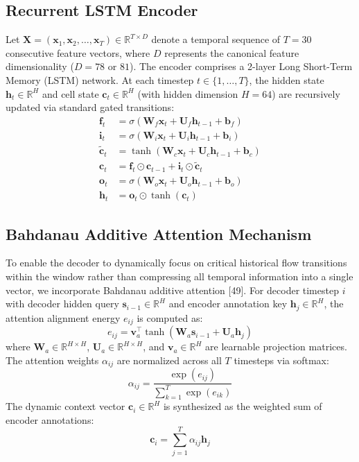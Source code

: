 \documentclass[twocolumn]{article}
\begin{document}
\subsection{Recurrent LSTM Encoder}
Let $\mathbf{X} = (\mathbf{x}_1, \mathbf{x}_2, \dots, \mathbf{x}_T) \in \mathbb{R}^{T \times D}$ denote a temporal sequence of $T=30$ consecutive feature vectors, where $D$ represents the canonical feature dimensionality ($D=78$ or $81$). The encoder comprises a 2-layer Long Short-Term Memory (LSTM) network. At each timestep $t \in \{1, \dots, T\}$, the hidden state $\mathbf{h}_t \in \mathbb{R}^H$ and cell state $\mathbf{c}_t \in \mathbb{R}^H$ (with hidden dimension $H=64$) are recursively updated via standard gated transitions:
\begin{align}
    \mathbf{f}_t &= \sigma(\mathbf{W}_f \mathbf{x}_t + \mathbf{U}_f \mathbf{h}_{t-1} + \mathbf{b}_f) \\
    \mathbf{i}_t &= \sigma(\mathbf{W}_i \mathbf{x}_t + \mathbf{U}_i \mathbf{h}_{t-1} + \mathbf{b}_i) \\
    \tilde{\mathbf{c}}_t &= \tanh(\mathbf{W}_c \mathbf{x}_t + \mathbf{U}_c \mathbf{h}_{t-1} + \mathbf{b}_c) \\
    \mathbf{c}_t &= \mathbf{f}_t \odot \mathbf{c}_{t-1} + \mathbf{i}_t \odot \tilde{\mathbf{c}}_t \\
    \mathbf{o}_t &= \sigma(\mathbf{W}_o \mathbf{x}_t + \mathbf{U}_o \mathbf{h}_{t-1} + \mathbf{b}_o) \\
    \mathbf{h}_t &= \mathbf{o}_t \odot \tanh(\mathbf{c}_t)
\end{align}

\subsection{Bahdanau Additive Attention Mechanism}
To enable the decoder to dynamically focus on critical historical flow transitions within the window rather than compressing all temporal information into a single vector, we incorporate Bahdanau additive attention [49]. For decoder timestep $i$ with decoder hidden query $\mathbf{s}_{i-1} \in \mathbb{R}^H$ and encoder annotation key $\mathbf{h}_j \in \mathbb{R}^H$, the attention alignment energy $e_{ij}$ is computed as:
\begin{equation}
    e_{ij} = \mathbf{v}_a^\top \tanh(\mathbf{W}_a \mathbf{s}_{i-1} + \mathbf{U}_a \mathbf{h}_j)
\end{equation}
where $\mathbf{W}_a \in \mathbb{R}^{H \times H}$, $\mathbf{U}_a \in \mathbb{R}^{H \times H}$, and $\mathbf{v}_a \in \mathbb{R}^H$ are learnable projection matrices. The attention weights $\alpha_{ij}$ are normalized across all $T$ timesteps via softmax:
\begin{equation}
    \alpha_{ij} = \frac{\exp(e_{ij})}{\sum_{k=1}^T \exp(e_{ik})}
\end{equation}
The dynamic context vector $\mathbf{c}_i \in \mathbb{R}^H$ is synthesized as the weighted sum of encoder annotations:
\begin{equation}
    \mathbf{c}_i = \sum_{j=1}^T \alpha_{ij} \mathbf{h}_j
\end{equation}
\end{document}
